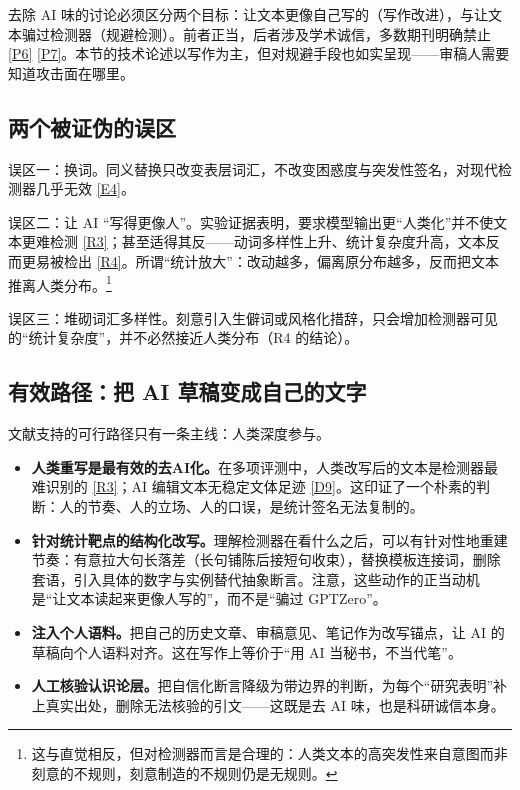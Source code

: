 \documentclass[10pt,a4paper]{ctexart}
\begin{document}
\begin{justifying}
去除 AI 味的讨论必须区分两个目标：让文本更像自己写的（写作改进），与让文本骗过检测器（规避检测）。前者正当，后者涉及学术诚信，多数期刊明确禁止 \href{https://www.cjter.com/attached/file/20240420/20240420151441_458.pdf}{[P6]} \href{https://www.nsmc.edu.cn/xbbjb/info/1222/4071.htm}{[P7]}。本节的技术论述以写作为主，但对规避手段也如实呈现——审稿人需要知道攻击面在哪里。

\subsection{两个被证伪的误区}

误区一：换词。同义替换只改变表层词汇，不改变困惑度与突发性签名，对现代检测器几乎无效 \href{https://www.eyesift.com/blog/ai-humanizer/}{[E4]}。

误区二：让 AI “写得更像人”。实验证据表明，要求模型输出更“人类化”并不使文本更难检测 \href{https://arxiv.org/abs/2412.05139}{[R3]}；甚至适得其反——动词多样性上升、统计复杂度升高，文本反而更易被检出 \href{https://arxiv.org/abs/2610.03110}{[R4]}。所谓“统计放大”：改动越多，偏离原分布越多，反而把文本推离人类分布。\footnote{这与直觉相反，但对检测器而言是合理的：人类文本的高突发性来自意图而非刻意的不规则，刻意制造的不规则仍是无规则。}

误区三：堆砌词汇多样性。刻意引入生僻词或风格化措辞，只会增加检测器可见的“统计复杂度”，并不必然接近人类分布（R4 的结论）。

\subsection{有效路径：把 AI 草稿变成自己的文字}

文献支持的可行路径只有一条主线：人类深度参与。

\begin{itemize}[leftmargin=2em,itemsep=1pt]
\item \textbf{人类重写是最有效的去AI化。}在多项评测中，人类改写后的文本是检测器最难识别的 \href{https://arxiv.org/abs/2412.05139}{[R3]}；AI 编辑文本无稳定文体足迹 \href{https://arxiv.org/abs/2608.27855}{[D9]}。这印证了一个朴素的判断：人的节奏、人的立场、人的口误，是统计签名无法复制的。
\item \textbf{针对统计靶点的结构化改写。}理解检测器在看什么之后，可以有针对性地重建节奏：有意拉大句长落差（长句铺陈后接短句收束），替换模板连接词，删除套语，引入具体的数字与实例替代抽象断言。注意，这些动作的正当动机是“让文本读起来更像人写的”，而不是“骗过 GPTZero”。
\item \textbf{注入个人语料。}把自己的历史文章、审稿意见、笔记作为改写锚点，让 AI 的草稿向个人语料对齐。这在写作上等价于“用 AI 当秘书，不当代笔”。
\item \textbf{人工核验认识论层。}把自信化断言降级为带边界的判断，为每个“研究表明”补上真实出处，删除无法核验的引文——这既是去 AI 味，也是科研诚信本身。
\end{itemize}


\end{justifying}
\end{document}
